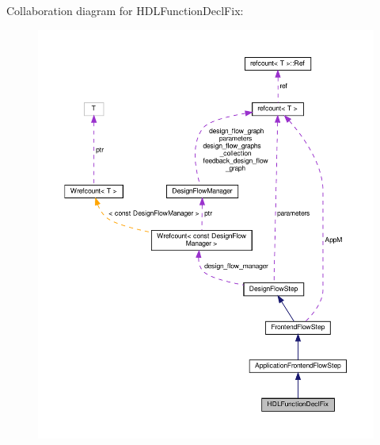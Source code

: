 Collaboration diagram for H\+D\+L\+Function\+Decl\+Fix\+:
\nopagebreak
\begin{figure}[H]
\begin{center}
\leavevmode
\includegraphics[width=350pt]{de/d2b/classHDLFunctionDeclFix__coll__graph}
\end{center}
\end{figure}
